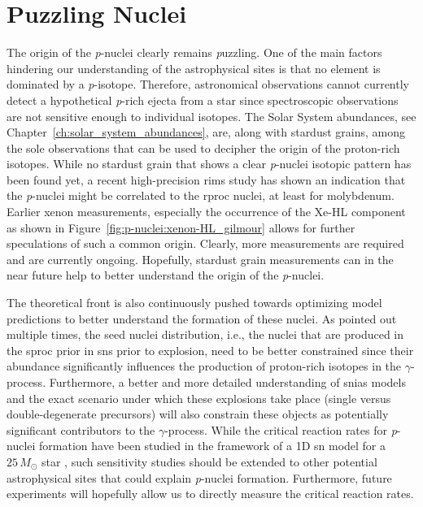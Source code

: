 


\section{Puzzling Nuclei}

The origin of the \textit{p}-nuclei clearly remains \textit{p}uzzling. One of the main factors hindering our understanding of the astrophysical sites is that no element is dominated by a \textit{p}-isotope. Therefore, astronomical observations cannot currently detect a hypothetical \textit{p}-rich ejecta from a star since spectroscopic observations are not sensitive enough to individual isotopes. The Solar System abundances, see Chapter~\ref{ch:solar_system_abundances}, are, along with stardust grains, among the sole observations that can be used to decipher the origin of the proton-rich isotopes. While no stardust grain that shows a clear \textit{p}-nuclei isotopic pattern has been found yet, a recent high-precision \ac{rims} study \citep{stephan19} has shown an indication that the \textit{p}-nuclei might be correlated to the \ac{rproc} nuclei, at least for molybdenum. Earlier xenon measurements, especially the occurrence of the Xe-HL component as shown in Figure~\ref{fig:p-nuclei:xenon-HL_gilmour} allows for further speculations of such a common origin. Clearly, more measurements are required and are currently ongoing. Hopefully, stardust grain measurements can in the near future help to better understand the origin of the \textit{p}-nuclei.

The theoretical front is also continuously pushed towards optimizing model predictions to better understand the formation of these nuclei. As pointed out multiple times, the seed nuclei distribution, i.e., the nuclei that are produced in the \ac{sproc} prior in \acp{sn} prior to explosion, need to be better constrained since their abundance significantly influences the production of proton-rich isotopes in the $\gamma$-process. Furthermore, a better and more detailed understanding of \acp{snia} models and the exact scenario under which these explosions take place (single versus double-degenerate precursors) will also constrain these objects as potentially significant contributors to the $\gamma$-process. While the critical reaction rates for \textit{p}-nuclei formation have been studied in the framework of a 1D \ac{sn} model for a $25\,M_\odot$ star \citep{rauscher16}, such sensitivity studies should be extended to other potential astrophysical sites that could explain \textit{p}-nuclei formation. Furthermore, future experiments will hopefully allow us to directly measure the critical reaction rates. 

